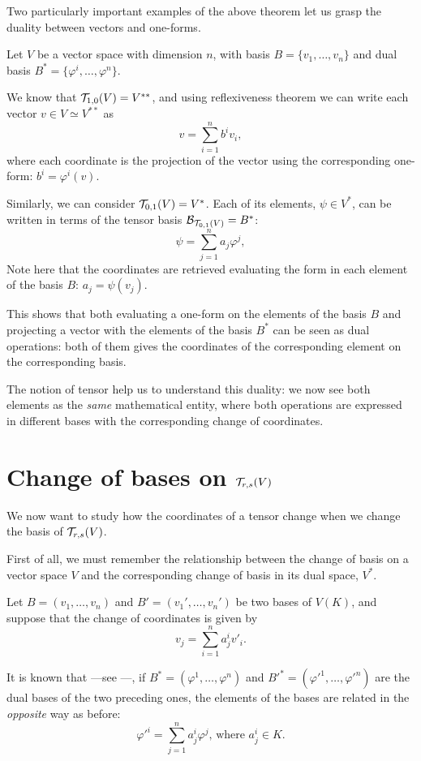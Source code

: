 Two particularly important examples of the above theorem let us grasp the duality between vectors and one-forms.

Let $V$ be a vector space with dimension $n$, with basis $B = \{v_1, \dots, v_n\}$ and dual basis $B^* = \{\varphi^i, \dots, \varphi^n\}$.

We know that ${\mathcal T}_{1,0}(V) = V^{**}$, and using reflexiveness theorem we can write each vector $v \in V \simeq V^{**}$ as
\[
v = \sum_{i=1}^n b^i v_i,
\]
where each coordinate is the projection of the vector using the corresponding one-form: $b^i = \varphi^i(v)$.

Similarly, we can consider ${\mathcal T}_{0,1}(V) = V^*$. Each of its elements, $\psi \in V^*$, can be written in terms of the tensor basis $\mathcal{B}_{{\mathcal T}_{0,1}(V)} = B^*$:
\[
	\psi = \sum_{j=1}^n a_j \varphi^j,
\]
Note here that the coordinates are retrieved evaluating the form in each element of the basis $B$: $a_j = \psi(v_j)$.

This shows that both evaluating a one-form on the elements of the basis $B$ and projecting a vector with the elements of the basis $B^*$ can be seen as dual operations: both of them gives the coordinates of the corresponding element on the corresponding basis.

The notion of tensor help us to understand this duality: we now see both elements as the \emph{same} mathematical entity, where both operations are expressed in different bases with the corresponding change of coordinates.

\section{Change of bases on ${\mathcal T}_{r,s}(V)$}

We now want to study how the coordinates of a tensor change when we change the basis of ${\mathcal T}_{r,s}(V)$.

First of all, we must remember the relationship between the change of basis on a vector space $V$ and the corresponding change of basis in its dual space, $V^*$.

Let $B = (v_1, \dots, v_n)$ and $B' = (v_1', \dots, v_n')$ be two bases of $V(K)$, and suppose that the change of coordinates is given by
\[
v_j = \sum_{i=1}^n a_j^i v'_i.
\]

It is known that ---see \cite[p. 162]{romero86}---, if $B^* = (\varphi^1, \dots, \varphi^n)$ and $B'^* = (\varphi'^1, \dots, \varphi'^n)$ are the dual bases of the two preceding ones, the elements of the bases are related in the \emph{opposite} way as before:
\begin{equation}
	\label{eq:changeV*}
	\varphi'^i = \sum_{j=1}^n a_j^i \varphi^j \textrm{, where } a_j^i \in K.
\end{equation}

